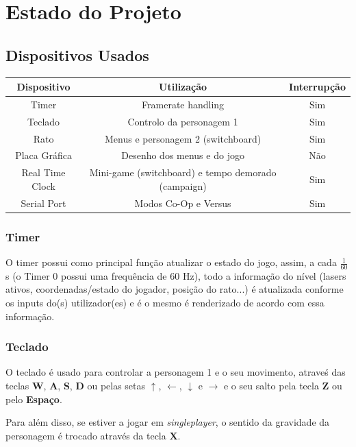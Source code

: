 \documentclass{report}
\begin{document}
\chapter{Estado do Projeto}

\section{Dispositivos Usados}

\begin{center}
	\begin{tabular}{|c|c|c|} 
		\hline
			Dispositivo & Utilização & Interrupção \\ 
		\hline
		\hline
			Timer & Framerate handling  & Sim \\ 
			Teclado & Controlo da personagem 1 & Sim \\ 
			Rato & Menus e personagem 2 (switchboard) & Sim\\
			Placa Gráfica & Desenho dos menus e do jogo & Não\\
			Real Time Clock & Mini-game (switchboard) e tempo demorado (campaign) & Sim\\
			Serial Port & Modos Co-Op e Versus & Sim \\
		\hline
	\end{tabular}
\end{center}

\subsection{Timer}

O timer possui como principal função atualizar o estado do jogo, assim, a cada $\frac{1}{60}$s (o Timer 0 possui uma frequência de 60 Hz), todo a informação do nível (lasers ativos, coordenadas/estado do jogador, posição do rato...) é atualizada conforme os inputs do(s) utilizador(es) e é o mesmo é renderizado de acordo com essa informação.

\subsection{Teclado}

O teclado é usado para controlar a personagem 1 e o seu movimento, atraveś das teclas \textbf{W}, \textbf{A}, \textbf{S}, \textbf{D} ou pelas setas $\uparrow$, $\leftarrow$, $\downarrow$ e $\rightarrow$ e o seu salto pela tecla \textbf{Z} ou pelo \textbf{Espaço}.

Para além disso, se estiver a jogar em \textit{singleplayer}, o sentido da gravidade da personagem é trocado através da tecla \textbf{X}.
\end{document}
